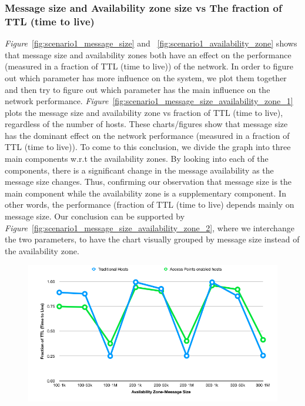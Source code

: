 {\subsubsection{Message size and Availability zone size vs The fraction of TTL (time to live)}
\emph{Figure}~\ref{fig:scenario1_message_size} and ~\ref{fig:scenario1_availability_zone} shows that message size and availability zones both have an effect on the performance (measured in a fraction of TTL (time to live)) of the network. In order to figure out which parameter has more influence on the system, we plot them together and then try to figure out which parameter has the main influence on the network performance.
\emph{Figure}~\ref{fig:scenario1_message_size_availability_zone_1} plots the message size and availability zone vs fraction of TTL (time to live), regardless of the number of hosts. These charts/figures show that message size has the dominant effect on the network performance (measured in a fraction of TTL (time to live)). To come to this conclusion, we divide the graph into three main components w.r.t the availability zones. By looking into each of the components, there is a significant change in the message availability as the message size changes. Thus, confirming our observation that message size is the main component while the availability zone is a supplementary component. In other words, the performance (fraction of TTL (time to live) depends mainly on message size.\newline
Our conclusion can be supported by \emph{Figure}~\ref{fig:scenario1_message_size_availability_zone_2}, where we interchange the two parameters, to have the chart visually grouped by message size instead of the availability zone.
\newpage
\begin{figure}[H]
  \centering
  \includegraphics[scale=0.55]{./figures/scenario1_message_size_availability_zone_1}

\end{figure}}
